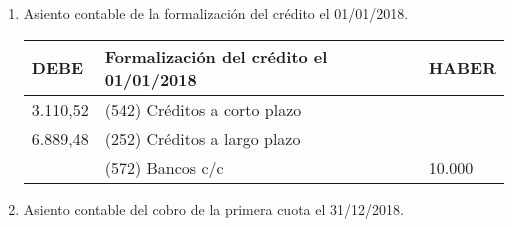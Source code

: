 \begin{enumerate}[label=\alph*)]
    \item Asiento contable de la formalización del crédito el 01/01/2018.
    
    \begin{table}[H]
        \centering
        \begin{tabular}{|p{3cm}|p{6cm}|p{3cm}|}
        \hline
        \rowcolor{blue!30}
        \textbf{DEBE} & \textbf{Formalización del crédito el 01/01/2018} & \textbf{HABER} \\
        \hline
        3.110,52 & (542) Créditos a corto plazo & \\
        \hline
        6.889,48 & (252) Créditos a largo plazo & \\
        \hline
        & (572) Bancos c/c & 10.000 \\
        \hline
        \end{tabular}
    \end{table}

    \item Asiento contable del cobro de la primera cuota el 31/12/2018.
    

\end{enumerate}
